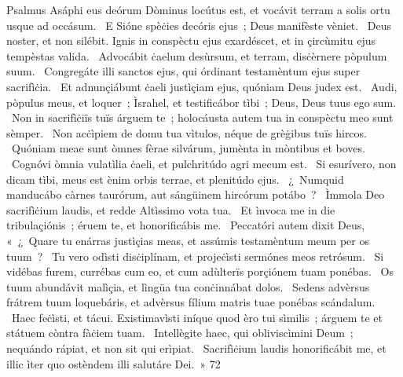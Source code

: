 { Psalmus Asáphi}
{%
eus deórum Dòminus locútus est, et vocávit terram a solis ortu usque ad occásum. 
~E Sióne spèċies decóris ejus~; Deus manifèste vèniet. 
~Deus noster, et non silébit. Ignis in conspèctu ejus exardéscet, et in çircùmitu ejus tempèstas valida. 
~Advocábit ċaelum desùrsum, et terram, disċèrnere pòpulum suum. 
~Congregáte illi sanctos ejus, qui órdinant testamèntum ejus super sacrifìċia. 
~Et adnunçiábunt ċaeli justìçiam ejus, quóniam Deus judex est. 
~Audi, pòpulus meus, et loquer~; Ìsrahel, et testificábor tìbi~; Deus, Deus tuus ego sum. 
~Non in sacrifìċiïs tuïs árguem te~; holocáusta autem tua in conspèctu meo sunt sèmper. 
~Non acċìpiem de domu tua vìtulos, néque de grèġibus tuïs hircos. 
~Quóniam meae sunt òmnes fèrae silvárum, jumènta in mòntibus et boves. 
~Cognóvi òmnia vulatìlia ċaeli, et pulchritúdo agri mecum est. 
~Si esurívero, non dicam tìbi, meus est ènim orbis terrae, et plenitúdo ejus. 
~¿~Numquid manducábo càrnes taurórum, aut sángüinem hircórum potábo~? 
~Ìmmola Deo sacrifìċium laudis, et redde Altìssimo vota tua. 
~Et ìnvoca me in die tribulaçiónis~; éruem te, et honorificábis me. 
~Peccatóri autem dixit Deus, «~¿~Quare tu enárras justìçias meas, et assúmis testamèntum meum per os tuum~? 
~Tu vero odìsti disċiplínam, et projeċìsti sermónes meos retrósum. 
~Si vidébas furem, currébas cum eo, et cum adùlterïs porçiónem tuam ponébas. 
~Os tuum abundávit malìçia, et lìngüa tua conċinnábat dolos. 
~Sedens advèrsus frátrem tuum loquebáris, et advèrsus fílium matris tuae ponébas scándalum. 
~Haec feċìsti, et tácui. Existimavìsti iníque quod èro tui sìmilis~; árguem te et státuem còntra fàċiem tuam. 
~Intellègite haec, qui obliviscìmini Deum~; nequándo rápiat, et non sit qui erìpiat. 
~Sacrifìċium laudis honorificábit me, et illic ìter quo ostèndem illi salutáre Dei.~»
}
{7}{2}
